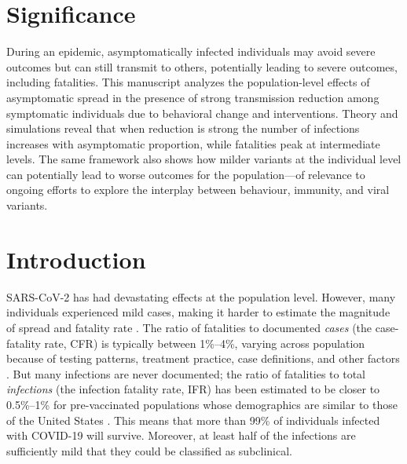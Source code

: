 \documentclass[12pt]{article}
\begin{document}
\section*{Significance}

During an epidemic, asymptomatically infected individuals may avoid severe outcomes but can still transmit to others, potentially leading to severe outcomes, including fatalities.
This manuscript analyzes the population-level effects of asymptomatic spread in the presence of strong transmission reduction among symptomatic individuals due to behavioral change and interventions.
Theory and simulations reveal that when reduction is strong the number of infections increases with asymptomatic proportion, while fatalities peak at intermediate levels.
The same framework also shows how milder variants at the individual level can potentially lead to worse outcomes for the population---of relevance to ongoing efforts to explore the interplay between behaviour, immunity, and viral variants.

\pagebreak

\section*{Introduction}

SARS-CoV-2 has had devastating effects at the population level.
However, many individuals experienced mild cases, making it harder to estimate the magnitude of spread and fatality rate \cite{nogrady2020data}.
The ratio of fatalities to documented \emph{cases} (the case-fatality rate, CFR) is typically between 1\%--4\%, varying across population because of testing patterns, treatment practice, case definitions, and other factors \cite{rajgor2020many,VERITY2020669,yang2020early}.
But many infections are never documented;
the ratio of fatalities to total \emph{infections} (the infection fatality rate, IFR) has been estimated to be closer to 0.5\%--1\% for pre-vaccinated populations whose demographics are similar to those of the United States \cite{levin2020assessing}. 
This means that more than 99\% of individuals infected with COVID-19 will survive. 
Moreover, at least half of the infections are sufficiently mild that they could be classified as subclinical. 
\end{document}
